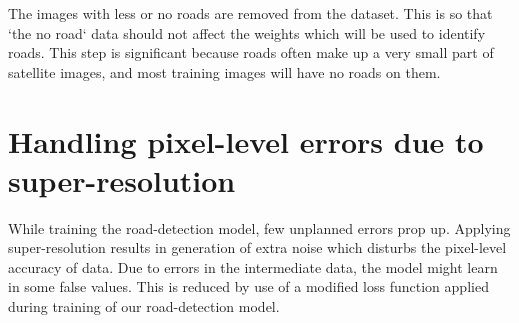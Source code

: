 The images with less or no roads are removed from the dataset. This is so that `the no road` data should not affect the weights which will be used to identify roads. This step is significant because roads often make up a very small part of satellite images, and most training images will have no roads on them. \par


\section{Handling pixel-level errors due to super-resolution}
While training the road-detection model, few unplanned errors prop up. Applying super-resolution results in generation of extra noise which disturbs the pixel-level accuracy of data. Due to errors in the intermediate data, the model might learn in some false values. This is reduced by use of a modified loss function applied during training of our road-detection model.